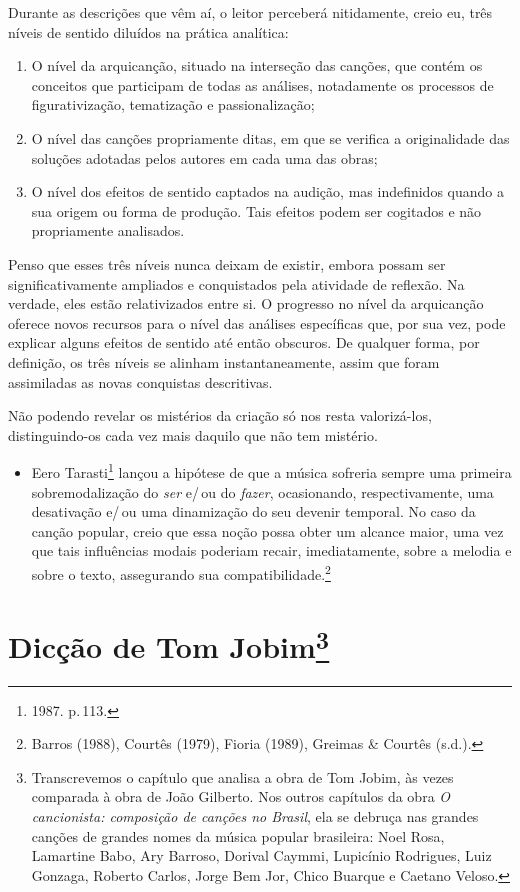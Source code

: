 Durante as descrições que vêm aí, o leitor perceberá nitidamente, creio
eu, três níveis de sentido diluídos na prática analítica:

\begin{enumerate}[label=\scshape\alph*.]
\item O nível da arquicanção, situado na interseção das canções, que contém
os conceitos que participam de todas as análises, notadamente os
processos de figurativização, tematização e passionalização;

\item O nível das canções propriamente ditas, em que se verifica a
originalidade das soluções adotadas pelos autores em cada uma das obras;

\item O nível dos efeitos de sentido captados na audição, mas indefinidos
quando a sua origem ou forma de produção. Tais efeitos podem ser
cogitados e não propriamente analisados.
\end{enumerate}

Penso que esses três níveis nunca deixam de existir, embora possam ser
significativamente ampliados e conquistados pela atividade de reflexão.
Na verdade, eles estão relativizados entre si. O progresso no nível da
arquicanção oferece novos recursos para o nível das análises específicas
que, por sua vez, pode explicar alguns efeitos de sentido até então
obscuros. De qualquer forma, por definição, os três níveis se alinham
instantaneamente, assim que foram assimiladas as novas conquistas
descritivas.

Não podendo revelar os mistérios da criação só nos resta valorizá-los,
distinguindo-os cada vez mais daquilo que não tem mistério.

\begin{itemize}
\item
  Eero Tarasti\footnote{1987. p.\,113.} lançou a hipótese de que a música sofreria
  sempre uma primeira sobremodalização do \textit{ser} e/\,ou do \textit{fazer},
  ocasionando, respectivamente, uma desativação e/\,ou uma dinamização do
  seu devenir temporal. No caso da canção popular, creio que essa noção
  possa obter um alcance maior, uma vez que tais influências modais
  poderiam recair, imediatamente, sobre a melodia e sobre o texto,
  assegurando sua compatibilidade.\footnote{Barros (1988), Courtês (1979), Fioria (1989), Greimas \& Courtês (s.d.).}
\end{itemize}

\chapter{Dicção de Tom Jobim\footnote{Transcrevemos o capítulo que analisa a obra de Tom Jobim, às vezes comparada à obra de João Gilberto. Nos outros capítulos da obra \textit{O cancionista: composição de canções no
Brasil}, ela se debruça nas grandes canções de grandes nomes da música popular brasileira: Noel Rosa, Lamartine Babo, Ary Barroso, Dorival Caymmi, Lupicínio Rodrigues, Luiz Gonzaga, Roberto Carlos, Jorge Bem Jor, Chico Buarque e Caetano Veloso.}}


